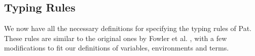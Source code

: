 \vspace{-0.3cm}
\begin{center}
\end{center}
\vspace{-0.7cm}



\subsection{Typing Rules}
\label{sec:typing-rules}
We now have all the necessary definitions for specifying the typing rules of Pat.
These rules are similar to the original ones by Fowler et al.
\cite{fowlerSpecialDeliveryProgramming2023}, with a few modifications to fit our
definitions of variables, environments and terms.

